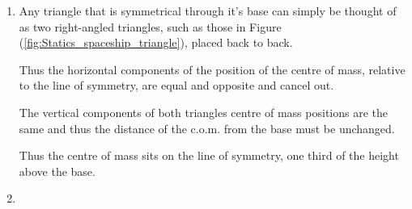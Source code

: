 \begin{problem}
{\begin{enumerate}
	As the triangle defined by $x$ and $h$ must be similar to that defined by $L$ and $H$, we know $h = \frac{Hx}{L}$.
	
	For small enough $d{x}$, the area $d{A}$ can be approximated as a rectangle, thus:
	
	\begin{equation}	d{A} = h~d{x} = \frac{H x~d{x}}{L}  \end{equation}
	
	Total moment $G$, taken around the point $x=0$, satisfies:
	
	\begin{equation}	G = M X = \sum{x~dm} = \sum{\frac{\rho H x^{2} ~dx}{L}}  \end{equation}
	
	As $dx$ goes to zero the sum of finite areas $dA$ goes to a continuous integral:
	
	\begin{equation}	G = \int_0^L \frac{\rho H x^2}{L}~ \d{x} = \frac{\rho H}{L}\left[\frac{x^3}{3}\right]^L_0 = \frac{\rho H L^2}{3}  \end{equation}
	
	Also we know $M = \rho A = \rho \frac{H L}{2}$
	
	And therefore:
	
	\begin{equation}	 \rho \frac{H L}{2} D =  \frac{\rho H L^2}{3} 
	 \Rightarrow D = \frac{2L}{3} \end{equation}
	
	Thus the centre of mass lies two thirds of the distance from the tip, and thus one third of the distance from the base.
	
	\item Any triangle that is symmetrical through it's base can simply be thought of as two right-angled triangles, such as those in Figure (\ref{fig:Statics_spaceship_triangle}), placed back to back.
	
	Thus the horizontal components of the position of the centre of mass, relative to the line of symmetry, are equal and opposite and cancel out.
	
	The vertical components of both triangles centre of mass positions are the same and thus the distance of the c.o.m. from the base must be unchanged.
	
	Thus the centre of mass sits on the line of symmetry, one third of the height above the base.
	
	\item
	

\end{enumerate}}
\end{problem}
